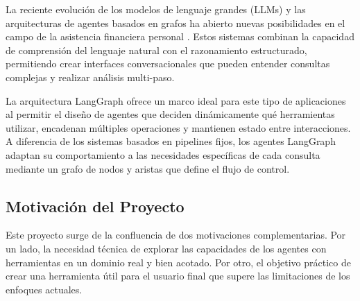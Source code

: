 La reciente evolución de los modelos de lenguaje grandes (LLMs) y las arquitecturas de agentes basados en grafos ha abierto nuevas posibilidades en el campo de la asistencia financiera personal \cite{tool_using_agents2023}. Estos sistemas combinan la capacidad de comprensión del lenguaje natural con el razonamiento estructurado, permitiendo crear interfaces conversacionales que pueden entender consultas complejas y realizar análisis multi-paso.

La arquitectura LangGraph \cite{langgraph2024} ofrece un marco ideal para este tipo de aplicaciones al permitir el diseño de agentes que deciden dinámicamente qué herramientas utilizar, encadenan múltiples operaciones y mantienen estado entre interacciones. A diferencia de los sistemas basados en pipelines fijos, los agentes LangGraph adaptan su comportamiento a las necesidades específicas de cada consulta mediante un grafo de nodos y aristas que define el flujo de control.

\subsection{Motivación del Proyecto}
\label{subsec:motivacion}

Este proyecto surge de la confluencia de dos motivaciones complementarias. Por un lado, la necesidad técnica de explorar las capacidades de los agentes con herramientas en un dominio real y bien acotado. Por otro, el objetivo práctico de crear una herramienta útil para el usuario final que supere las limitaciones de los enfoques actuales.
